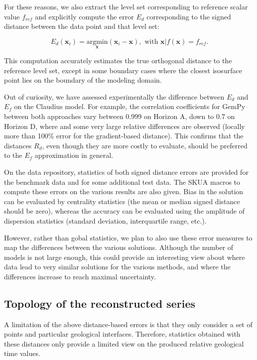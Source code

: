 \documentclass[preprint]{ring20}
\newcommand{\bx}{\mathbf{x}}
\begin{document}
For these reasons, we also extract the level set corresponding to reference scalar value $f_{ref}$ and explicitly compute the error $E_d$ corresponding to the signed distance between the data point and that level set: 

\begin{equation}
\label{eq:errd}
E_d(\bx_i) = \underset{\bx}{\mathrm{argmin}} \left(\bx_i - \bx \right), \mbox{ with } \bx | f(\bx) = f_{ref}.
\end{equation}

This computation accurately estimates the true orthogonal distance to the reference level set, except in some boundary cases where the closest isosurface point lies on the boundary of the modeling domain.  

Out of curiosity, we have assessed experimentally the difference between $E_d$ and $E_f$ on the Claudius model. For example, the correlation coefficients for GemPy between both approaches vary between 0.999 on Horizon A, down to 0.7 on Horizon D, where and some very large relative differences are observed (locally  more than 100\% error for the gradient-based distance). This confirms that the distances $R_d$, even though they are more costly to evaluate, should be preferred to the $E_f$ approximation in general.  

On the data repository, statistics of both signed distance errors are provided for the benchmark data and for some additional test data. The SKUA macros to compute these errors on the various results are also given. Bias in the solution can be evaluated by centrality statistics (the mean or median signed distance should be zero), whereas the accuracy can be evaluated using the amplitude of dispersion statistics (standard deviation, interquartile range, etc.). 

However, rather than gobal statistics, we plan to also use these error measures to map the differences between the various solutions. Although the number of models is not large enough, this could provide an interesting view about where data lead to very similar solutions for the various methods, and where the differences increase to reach maximal uncertainty.  


\subsection{Topology of the reconstructed series}

A limitation of the above distance-based errors is that they only consider a set of points and particular geological interfaces. Therefore, statistics obtained with these distances only provide a limited view on the produced relative geological time values. 
\end{document}
